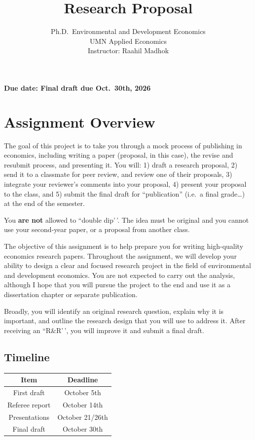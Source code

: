 \documentclass[
]{article}
\title{Research Proposal}
\subtitle{Ph.D.~Environmental and Development Economics\\
UMN Applied Economics\\
Instructor: Raahil Madhok}
\author{}
\date{\vspace{-2.5em}}
\begin{document}
\maketitle

\textbf{Due date: Final draft due Oct.~30th, 2026}

\hypertarget{assignment-overview}{%
\section{Assignment Overview}\label{assignment-overview}}

The goal of this project is to take you through a mock process of publishing in economics, including writing a paper (proposal, in this case), the revise and resubmit process, and presenting it. You will: 1) draft a research proposal, 2) send it to a classmate for peer review, and review one of their proposals, 3) integrate your reviewer's comments into your proposal, 4) present your proposal to the class, and 5) submit the final draft for ``publication'' (i.e.~a final grade\ldots) at the end of the semester.

You \textbf{are not} allowed to ``double dip'\,'. The idea must be original and you cannot use your second-year paper, or a proposal from another class.

The objective of this assignment is to help prepare you for writing high-quality economics research papers. Throughout the assignment, we will develop your ability to design a clear and focused research project in the field of environmental and development economics. You are not expected to carry out the analysis, although I hope that you will pursue the project to the end and use it as a dissertation chapter or separate publication.

Broadly, you will identify an original research question, explain why it is important, and outline the research design that you will use to address it. After receiving an ``R\&R'\,', you will improve it and submit a final draft.

\hypertarget{timeline}{%
\subsection{Timeline}\label{timeline}}

\begin{table}[ht]
\begin{tabular}{|c|c|}
\hline
\textbf{Item} & \textbf{Deadline} \\ \hline
First draft     & October 5th     \\ \hline
Referee report    & October 14th     \\ \hline
Presentations    & October 21/26th     \\ \hline
Final draft    & October 30th     \\ \hline
\end{tabular}
\end{table}
\end{document}
